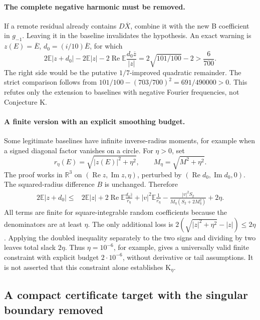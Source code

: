 \paragraph{The complete negative harmonic must be removed.}
If a remote residual already contains $D\overline X$, combine it with the new B coefficient in $g_{-1}$. Leaving it in the baseline invalidates the hypothesis. An exact warning is $z(E)=\overline E$, $d_0=(i/10)\overline E$, for which
\[
2\mathbb E|z+d_0|-2\mathbb E|z|
 -2\operatorname{Re}\mathbb E\frac{d_0\overline z}{|z|}
=2\sqrt{101/100}-2>\frac6{700}.
\]
The right side would be the putative $1/7$-improved quadratic remainder. The strict comparison follows from
$101/100-(703/700)^2=691/490000>0$.
This refutes only the extension to baselines with negative Fourier frequencies, not Conjecture K.

\paragraph{A finite version with an explicit smoothing budget.}
Some legitimate baselines have infinite inverse-radius moments, for example when a signed diagonal factor vanishes on a circle. For $\eta>0$, set
\[
r_\eta(E)=\sqrt{|z(E)|^2+\eta^2},\qquad
M_\eta=\sqrt{M^2+\eta^2}.
\]
The proof works in $\mathbb R^3$ on $(\operatorname{Re}z,\operatorname{Im}z,\eta)$, perturbed by $(\operatorname{Re}d_0,\operatorname{Im}d_0,0)$. The squared-radius difference $B$ is unchanged. Therefore
\begin{align*}
2\mathbb E|z+d_0|\le{}&2\mathbb E|z|
 +2\operatorname{Re}\mathbb E\frac{d_0\overline z}{r_\eta}
 +|v|^2\mathbb E\frac1{r_\eta}
 -\frac{|v|^2S_2}{M_\eta(S_2+2M_\eta^2)}+2\eta.
\end{align*}
All terms are finite for square-integrable random coefficients because the denominators are at least $\eta$. The only additional loss is
$2(\sqrt{|z|^2+\eta^2}-|z|)\le2\eta$.
Applying the doubled inequality separately to the two signs and dividing by two leaves total slack $2\eta$.
Thus $\eta=10^{-6}$, for example, gives a universally valid finite constraint with explicit budget $2\cdot10^{-6}$, without derivative or tail assumptions. It is not asserted that this constraint alone establishes K$_\eta$.


\subsection{A compact certificate target with the singular boundary removed}
\label{sec:ch37-compact}
